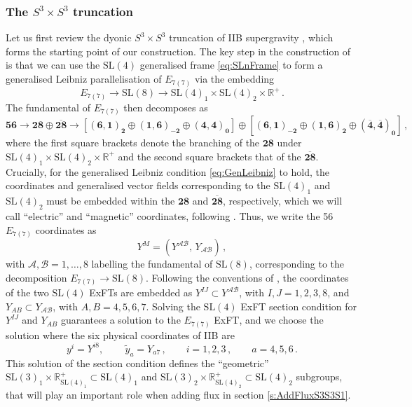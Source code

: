 \documentclass[a4paper, 11pt]{article}
\numberwithin{equation}{section}
\newcommand{\SL}[1]{\mathrm{SL}( #1 )}
\newcommand{\En}[1]{E_{#1(#1)}}
\newcommand{\+}{\oplus}
\newcommand{\cA}{\mathcal{A}}
\newcommand{\cB}{\mathcal{B}}
\newcommand{\RO}{\mathbb{R}^+_{\SL{4}_1}}
\newcommand{\RT}{\mathbb{R}^+_{\SL{4}_2}}
\begin{document}
\subsubsection{The $S^3 \times S^3$ truncation} \label{s:S3S3}
Let us first review the dyonic $S^3 \times S^3$ truncation of IIB supergravity \cite{Inverso:2016eet}, which forms the starting point of our construction. The key step in the construction of \cite{Inverso:2016eet} is that we can use the $\SL{4}$ generalised frame \eqref{eq:SLnFrame} to form a generalised Leibniz parallelisation of $\En{7}$ via the embedding
\begin{equation} \label{eq:SL4Embedding}
	\En{7} \rightarrow \SL{8} \rightarrow \SL{4}_1 \times \SL{4}_2 \times \mathbb{R}^+ \,.
\end{equation}
The fundamental of $\En{7}$ then decomposes as
\begin{equation} \label{eq:56inSL4SL4}
	\mathbf{56} \rightarrow \mathbf{28} \oplus \overline{\mathbf{28}} \rightarrow \left[ \mathbf{\left(6,1\right)_2} \oplus \mathbf{\left(1,6\right)_{-2}} \oplus \mathbf{\left(4,4\right)_0} \right] \oplus \left[ \mathbf{\left(6,1\right)_{-2}} \oplus \mathbf{\left(1,6\right)_{2}} \oplus \mathbf{\left(\overline{4},\overline{4}\right)_0} \right] \,,
\end{equation}
where the first square brackets denote the branching of the $\mathbf{28}$ under $\SL{4}_1 \times \SL{4}_2 \times \mathbb{R}^+$ and the second square brackets that of the $\mathbf{\overline{28}}$. Crucially, for the generalised Leibniz condition \eqref{eq:GenLeibniz} to hold, the coordinates and generalised vector fields corresponding to the $\SL{4}_1$ and $\SL{4}_2$ must be embedded within the $\mathbf{28}$ and $\mathbf{\overline{28}}$, respectively, which we will call ``electric'' and ``magnetic'' coordinates, following \cite{Inverso:2016eet}. Thus, we write the 56 $\En{7}$ coordinates as
\begin{equation}
	Y^M = \left( Y^{\cA\cB} ,\, Y_{\cA\cB} \right) \,,
\end{equation}
with $\cA, \cB = 1, \ldots, 8$ labelling the fundamental of $\SL{8}$, corresponding to the decomposition $\En{7} \rightarrow \SL{8}$. Following the conventions of \cite{Inverso:2016eet}, the coordinates of the two $\SL{4}$ ExFTs are embedded as $Y^{IJ} \subset Y^{\cA\cB}$, with $I, J = 1, 2, 3, 8$, and $Y_{AB} \subset Y_{\cA\cB}$, with $A, B = 4, 5, 6, 7$. Solving the $\SL{4}$ ExFT section condition for $Y^{IJ}$ and $Y_{AB}$ guarantees a solution to the $\En{7}$ ExFT, and we choose the solution where the six physical coordinates of IIB are
\begin{equation} \label{eq:PhysicalCoords}
	y^i = Y^{i8},\, \qquad \tilde{y}_a = Y_{a7} \,, \qquad i = 1, 2, 3 \,, \qquad a = 4, 5, 6 \,.
\end{equation}
This solution of the section condition defines the ``geometric'' $\SL{3}_1 \times \RO \subset \SL{4}_1$ and $\SL{3}_2 \times \RT \subset \SL{4}_2$ subgroups, that will play an important role when adding flux in section \ref{s:AddFluxS3S3S1}.
\end{document}
